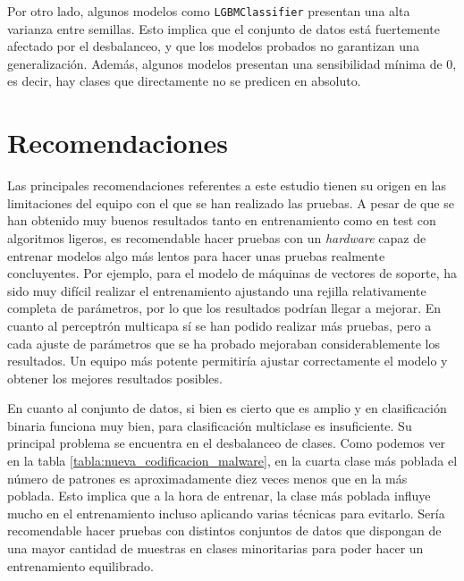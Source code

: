 \vspace{1em}

Por otro lado, algunos modelos como \texttt{LGBMClassifier} presentan una alta varianza entre semillas. Esto implica que el conjunto de datos está fuertemente afectado por el desbalanceo, y que los modelos probados no garantizan una generalización. Además, algunos modelos presentan una sensibilidad mínima de 0, es decir, hay clases que directamente no se predicen en absoluto.

\section{Recomendaciones}
\label{sec:recomendaciones}

Las principales recomendaciones referentes a este estudio tienen su origen en las limitaciones del equipo con el que se han realizado las pruebas. A pesar de que se han obtenido muy buenos resultados tanto en entrenamiento como en test con algoritmos ligeros, es recomendable hacer pruebas con un \textit{hardware} capaz de entrenar modelos algo más lentos para hacer unas pruebas realmente concluyentes. Por ejemplo, para el modelo de máquinas de vectores de soporte, ha sido muy difícil realizar el entrenamiento ajustando una rejilla relativamente completa de parámetros, por lo que los resultados podrían llegar a mejorar. En cuanto al perceptrón multicapa sí se han podido realizar más pruebas, pero a cada ajuste de parámetros que se ha probado mejoraban considerablemente los resultados. Un equipo más potente permitiría ajustar correctamente el modelo y obtener los mejores resultados posibles.

\vspace{1em}

En cuanto al conjunto de datos, si bien es cierto que es amplio y en clasificación binaria funciona muy bien, para clasificación multiclase es insuficiente. Su principal problema se encuentra en el desbalanceo de clases. Como podemos ver en la tabla \ref{tabla:nueva_codificacion_malware}, en la cuarta clase más poblada el número de patrones es aproximadamente diez veces menos que en la más poblada. Esto implica que a la hora de entrenar, la clase más poblada influye mucho en el entrenamiento incluso aplicando varias técnicas para evitarlo. Sería recomendable hacer pruebas con distintos conjuntos de datos que dispongan de una mayor cantidad de muestras en clases minoritarias para poder hacer un entrenamiento equilibrado.
